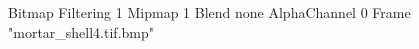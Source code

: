 {Bitmap
	{Filtering 1}
	{Mipmap 1}
	{Blend none}
	{AlphaChannel 0}
	{Frame "mortar_shell4.tif.bmp"}
}
